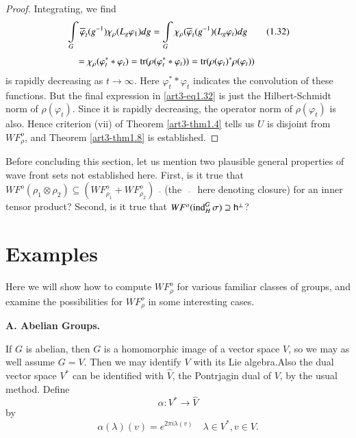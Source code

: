 \begin{proof}
Integrating, we find
\begin{align*}
&\int\limits_{G}\overline{\varphi}_{t}(g^{-1})\chi_{\rho}(L_{g}\varphi_{1})dg=\int\limits_{G}\chi_{\rho}(\overline{\varphi}_{t}(g^{-1})(L_{g}\varphi_{t})dg\tag{1.32}\label{art3-eq1.32}\\[3pt]
&\quad = \chi_{\rho}(\varphi^{*}_{t}*\varphi_{t})=\operatorname{tr}(\rho(\varphi^{*}_{t}*\varphi_{t}))=\operatorname{tr}(\rho(\varphi_{t})^{*}\rho(\varphi_{t}))
\end{align*}
is rapidly decreasing as $t\to \infty$. Here $\varphi^{*}_{t}*\varphi_{t}$ indicates the convolution of these functions. But the final expression in \eqref{art3-eq1.32} is just the Hilbert-Schmidt norm of $\rho(\varphi_{t})$. Since it is rapidly decreasing, the operator norm of $\rho(\varphi_{t})$ is also. Hence criterion (vii) of Theorem \ref{art3-thm1.4} tells us $U$ is disjoint from $WF^{o}_{\rho}$, and Theorem \ref{art3-thm1.8} is established.
\end{proof}

Before concluding this section, let us mention two plausible general properties of wave front sets not established here. First, is it true that $WF^{o}(\rho_{1}\otimes \rho_{2})\subseteq (WF^{o}_{\rho_{1}}+WF^{o}_{\rho_{2}})\overline{\quad}$(the $\overline{\quad}$ here denoting closure) for an inner tensor product? Second, is it true that $WF^{o}(\operatorname{ind}^{G}_{H}\sigma)\supseteq \mathsf{h}^{\perp}$?

\section{Examples}\label{art3-sec2}

Here we will show how to compute $WF^{o}_{\rho}$ for various familiar classes of groups, and examine the possibilities for $WF^{o}_{\rho}$ in some interesting cases.

\medskip
\noindent
{\bf A. Abelian Groups.}
\smallskip

If $G$ is abelian, then $G$ is a homomorphic image of a vector space $V$, so we may as well assume $G=V$. Then we may identify $V$ with its Lie algebra.\pageoriginale Also the dual vector space $V^{*}$ can be identified with $\widehat{V}$, the Pontrjagin dual of $V$, by the usual method. Define
$$
\alpha : V^{*}\to \widehat{V}
$$
by
\begin{equation*}
\alpha(\lambda)(v)=e^{2\pi i\lambda(v)}\quad \lambda\in V^{*},v\in V.\tag{2.1}\label{art3-eq2.1}
\end{equation*}


